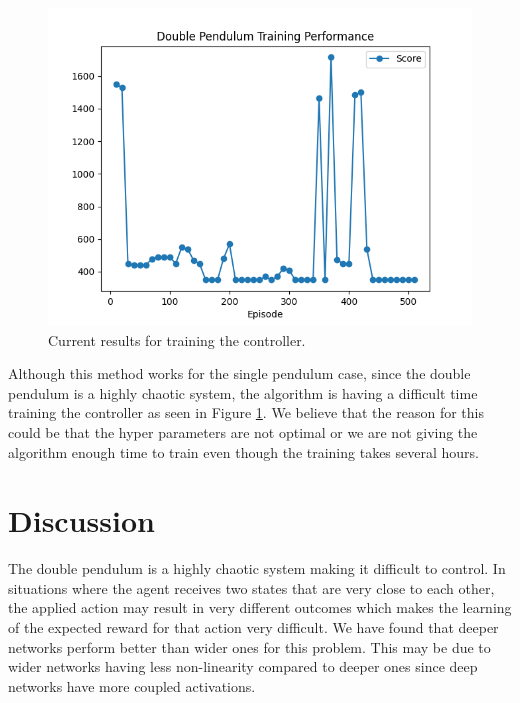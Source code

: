 \documentclass{LTHtwocol} %
\begin{document}
\begin{figure}[H]
	\centering
	\includegraphics[width=0.9\columnwidth]{figures/double_pendulum_eval.png}
	\caption{Current results for training the controller.}
	\label{fig:double_pendulum_score}
\end{figure}
Although this method works for the single pendulum case, since the double pendulum is a highly chaotic system, the algorithm is having a difficult time training the controller as seen in Figure \ref{fig:double_pendulum_score}.
We believe that the reason for this could be that the hyper parameters are not optimal or we are not giving the algorithm enough time to train even though the training takes several hours.
\section{Discussion}
The double pendulum is a highly chaotic system making it difficult to control.
In situations where the agent receives two states that are very close to each other, the applied action may result in very different outcomes which makes the learning of the expected reward for that action very difficult.
We have found that deeper networks perform better than wider ones for this problem.
This may be due to wider networks having less non-linearity compared to deeper ones since deep networks have more coupled activations.
\end{document}
